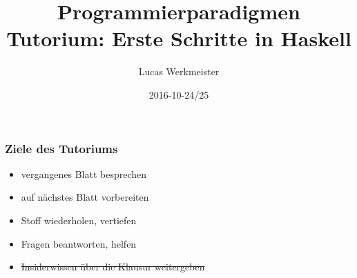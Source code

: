 \documentclass{beamer}
\title[\tiny \copyright 2013 by IPD Snelting -- Programmierparadigmen]{Programmierparadigmen \\ Tutorium: Erste Schritte in Haskell}
\author{Lucas Werkmeister}
\date{2016-10-24/25}
\begin{document}
\normalsize
\normalem

\begin{frame}[plain]
  \titlepage
\end{frame}

\begin{frame}
  \frametitle{Ziele des Tutoriums}
  \pause
  \begin{itemize}
  \item vergangenes Blatt besprechen
  \item auf nächstes Blatt vorbereiten
  \item Stoff wiederholen, vertiefen
  \item Fragen beantworten, helfen
  \item \sout{Insiderwissen über die Klausur weitergeben}
  \end{itemize}
\end{frame}
\end{document}
